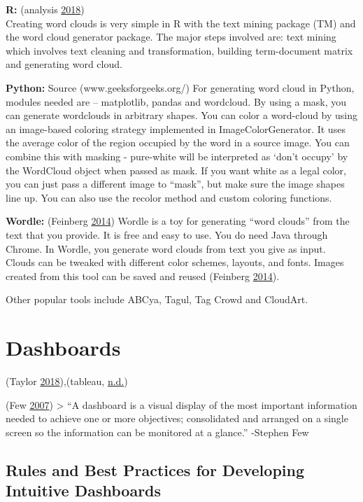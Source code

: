 \documentclass[]{book}
\begin{document}
\textbf{R:} (analysis \protect\hyperlink{ref-r}{2018})\\
Creating word clouds is very simple in R with the text mining package (TM) and the word cloud generator package. The major steps involved are: text mining which involves text cleaning and transformation, building term-document matrix and generating word cloud.

\textbf{Python:} Source (www.geeksforgeeks.org/)
For generating word cloud in Python, modules needed are -- matplotlib, pandas and wordcloud. By using a mask, you can generate wordclouds in arbitrary shapes. You can color a word-cloud by using an image-based coloring strategy implemented in ImageColorGenerator. It uses the average color of the region occupied by the word in a source image. You can combine this with masking - pure-white will be interpreted as `don't occupy' by the WordCloud object when passed as mask. If you want white as a legal color, you can just pass a different image to ``mask'', but make sure the image shapes line up. You can also use the recolor method and custom coloring functions.

\textbf{Wordle:} (Feinberg \protect\hyperlink{ref-wordle}{2014})
Wordle is a toy for generating ``word clouds'' from the text that you provide. It is free and easy to use. You do need Java through Chrome. In Wordle, you generate word clouds from text you give as input. Clouds can be tweaked with different color schemes, layouts, and fonts. Images created from this tool can be saved and reused (Feinberg \protect\hyperlink{ref-wordle}{2014}).

Other popular tools include ABCya, Tagul, Tag Crowd and CloudArt.

\hypertarget{dashboards}{%
\section{Dashboards}\label{dashboards}}

(Taylor \protect\hyperlink{ref-intuitive_dash}{2018}),(tableau, \protect\hyperlink{ref-dashboard_practices}{n.d.})

(Few \protect\hyperlink{ref-dashboard}{2007})
\textgreater{} ``A dashboard is a visual display of the most important information needed to achieve one or more objectives; consolidated and arranged on a single screen so the information can be monitored at a glance.'' -Stephen Few

\hypertarget{rules-and-best-practices-for-developing-intuitive-dashboards}{%
\subsection{Rules and Best Practices for Developing Intuitive Dashboards}\label{rules-and-best-practices-for-developing-intuitive-dashboards}}
\end{document}
